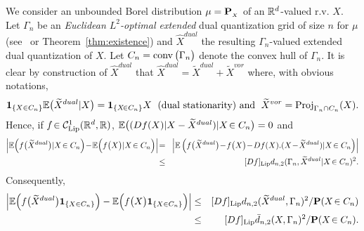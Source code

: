 We consider an  unbounded Borel  distribution $\mu=\mathbf{P}_{_X}$ of an $\mathbb{R}^d$-valued r.v. $X$. Let $\Gamma_{n}$ be an {\em  Euclidean $L^2$-optimal  extended} dual quantization grid of size $n$ for $\mu$ (see~\cite{dualStat} or  Theorem~\ref{thm:existence}) and $\widehat X^{dual}$
the resulting $\Gamma_n$-valued extended dual quantization of $X$. Let $C_{n}= \operatorname{conv}\big(\Gamma_{n}\big) $ denote the  convex hull of $\Gamma_n$. It is clear by construction of $\widehat X^{dual}$  that $\widehat X^{dual}\!=\! \widetilde X^{dual}
+\!\widetilde X^{vor}$
where, with obvious notations, 
\[
\mbox{\bf 1}_{\{X\in C_{n}\}} \mathbb{E}\big(\widetilde X^{dual}|X\big) = \mbox{\bf 1}_{\{X\!\in C_{n}\}} X\; \mbox{ (dual stationarity) and }\;  \widetilde X^{vor}= {\rm Proj}_{\Gamma_n \cap C_n}(X).
\]
Hence, if $f\!\in {\cal C}_{\rm Lip}^1(\mathbb{R}^d,\mathbb{R})$, $ \mathbb{E}\big((D f(X)|X-\widetilde X^{dual}) |X\!\in C_{n}\big)=0$ and 
\begin{eqnarray*}
\left|\E\Big(f\big(\widetilde X^{dual}\big) |X\!\in C_{n}  \Big)\!-\!\E\Big(f\big( X\big)|X\!\in C_{n}\Big)\right|&\!=\!&\left| \E\left(f\big(\widetilde X^{dual}\big)\!-\!f\big( X\big) \!-\!D f(X).(X\!-\!\widetilde X^{dual}) |X\!\in C_{n}\right)\right|\\
&\!\le\! & [D f]_{\rm Lip}d_{n,2}(\Gamma_{n},\widetilde X^{dual}| X\!\in C_{n})^2.
\end{eqnarray*}
Consequently, 
\begin{eqnarray*}
\left|\mathbb{E}\Big(f\big(\widetilde  X^{dual}\big)\mbox{\bf 1}_{\{X\in C_{n}\}} \Big) -\mathbb{E}\Big(f\big( X\big)\mbox{\bf 1}_{\{X\in C_{n}\}} \Big)\right|&\le&  [D f]_{\rm Lip}d_{n,2}(\widetilde X^{dual},\Gamma_{n})^2/\mathbf{P}( X\!\in C_{n})\\ &\le&  [D f]_{\rm Lip}\bar d_{n,2}(X,\Gamma_{n})^2/\mathbf{P}( X\!\in C_{n}).
\end{eqnarray*}
